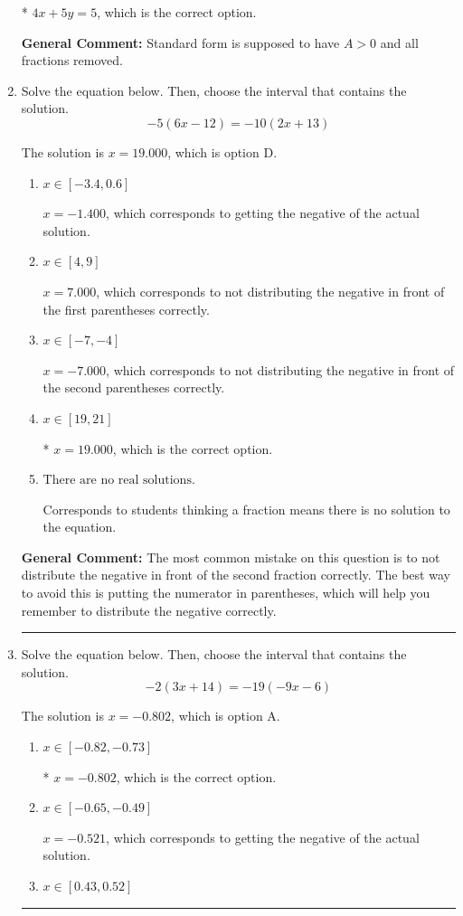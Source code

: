 \documentclass{extbook}[14pt]
\newcommand{\litem}[1]{\item #1

\rule{\textwidth}{0.4pt}}
\begin{document}
\begin{enumerate}
{\begin{enumerate}[label=\Alph*.]
* $4x + 5y = 5$, which is the correct option.
\end{enumerate}

\textbf{General Comment:} Standard form is supposed to have $A > 0$ and all fractions removed.
}
\litem{
Solve the equation below. Then, choose the interval that contains the solution.
\[ -5(6x -12) = -10(2x + 13) \]

The solution is \( x = 19.000 \), which is option D.\begin{enumerate}[label=\Alph*.]
\item \( x \in [-3.4, 0.6] \)

$x = -1.400$, which corresponds to getting the negative of the actual solution.
\item \( x \in [4, 9] \)

$x = 7.000$, which corresponds to not distributing the negative in front of the first parentheses correctly.
\item \( x \in [-7, -4] \)

$x = -7.000$, which corresponds to not distributing the negative in front of the second parentheses correctly.
\item \( x \in [19, 21] \)

* $x = 19.000$, which is the correct option.
\item \( \text{There are no real solutions.} \)

Corresponds to students thinking a fraction means there is no solution to the equation.
\end{enumerate}

\textbf{General Comment:} The most common mistake on this question is to not distribute the negative in front of the second fraction correctly. The best way to avoid this is putting the numerator in parentheses, which will help you remember to distribute the negative correctly.
}
\litem{
Solve the equation below. Then, choose the interval that contains the solution.
\[ -2(3x + 14) = -19(-9x -6) \]

The solution is \( x = -0.802 \), which is option A.\begin{enumerate}[label=\Alph*.]
\item \( x \in [-0.82, -0.73] \)

* $x = -0.802$, which is the correct option.
\item \( x \in [-0.65, -0.49] \)

$x = -0.521$, which corresponds to getting the negative of the actual solution.
\item \( x \in [0.43, 0.52] \)


\end{enumerate}}
\end{enumerate}
\end{document}
